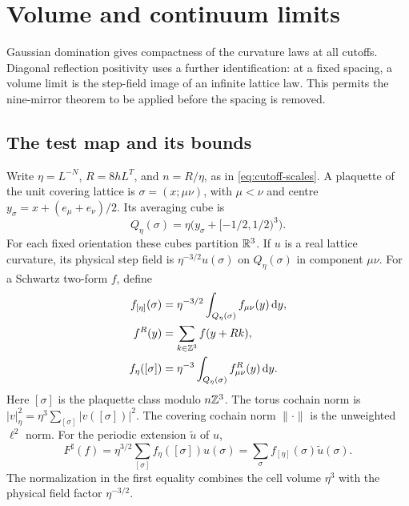 \section{Volume and continuum limits}\label{sec:continuum-limits}

Gaussian domination gives compactness of the curvature laws at all
cutoffs. Diagonal reflection positivity uses a further identification:
at a fixed spacing, a volume limit is the step-field image of an
infinite lattice law. This permits the nine-mirror theorem to be
applied before the spacing is removed.

\subsection{The test map and its bounds}

Write $\eta=L^{-N}$, $R=8hL^T$, and $n=R/\eta$, as in
\eqref{eq:cutoff-scales}. A plaquette of the unit covering lattice is
$\sigma=(x;\mu\nu)$, with $\mu<\nu$ and centre
$y_\sigma=x+(e_\mu+e_\nu)/2$. Its averaging cube is
\[
 Q_\eta(\sigma)=\eta\bigl(y_\sigma+[-1/2,1/2)^3\bigr).
\]
For each fixed orientation these cubes partition $\mathbb R^3$.
If $u$ is a real lattice curvature, its physical step field is
$\eta^{-3/2}u(\sigma)$ on $Q_\eta(\sigma)$ in component $\mu\nu$.
For a Schwartz two-form $f$, define
\begin{align}
 f_{[\eta]}(\sigma)
   &=\eta^{-3/2}\int_{Q_\eta(\sigma)}f_{\mu\nu}(y)\,\mathrm d y,
                                                   \label{eq:limit-test-cover}\\
 f^R(y)&=\sum_{k\in\mathbb Z^3}f(y+Rk),\notag\\
 f_\eta([\sigma])
   &=\eta^{-3}\int_{Q_\eta(\sigma)}f^R_{\mu\nu}(y)\,\mathrm d y.
                                                   \label{eq:limit-test-torus}
\end{align}
Here $[\sigma]$ is the plaquette class modulo $n\mathbb Z^3$.
The torus cochain norm is $|v|_\eta^2=\eta^3\sum_{[\sigma]}|v([\sigma])|^2$.
The covering cochain norm $\|\cdot\|$ is the unweighted $\ell^2$ norm.
For the periodic extension $\widetilde u$ of $u$,
\begin{equation}\label{eq:limit-step-pairing}
 F^\sharp(f)=\eta^{3/2}\sum_{[\sigma]}f_\eta([\sigma])u(\sigma)
            =\sum_\sigma f_{[\eta]}(\sigma)\widetilde u(\sigma).
\end{equation}
The normalization in the first equality combines the cell volume
$\eta^3$ with the physical field factor $\eta^{-3/2}$.

